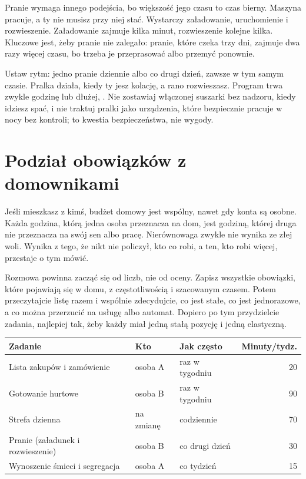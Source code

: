 Pranie wymaga innego podejścia, bo większość jego czasu to czas bierny.
Maszyna pracuje, a ty nie musisz przy niej stać. Wystarczy załadowanie,
uruchomienie i rozwieszenie. Załadowanie zajmuje kilka minut, rozwieszenie
kolejne kilka. Kluczowe jest, żeby pranie nie zalegało: pranie, które
czeka trzy dni, zajmuje dwa razy więcej czasu, bo trzeba je przeprasować
albo przemyć ponownie.

Ustaw rytm: jedno pranie dziennie albo co drugi dzień, zawsze w tym samym
czasie. Pralka działa, kiedy ty jesz kolację, a rano rozwieszasz. Program
trwa zwykle godzinę lub dłużej, . Nie zostawiaj włączonej suszarki bez nadzoru,
kiedy idziesz spać, i nie traktuj pralki jako urządzenia, które bezpiecznie
pracuje w nocy bez kontroli; to kwestia bezpieczeństwa, nie wygody.

\section{Podział obowiązków z domownikami}

Jeśli mieszkasz z kimś, budżet domowy jest wspólny, nawet gdy konta są
osobne. Każda godzina, którą jedna osoba przeznacza na dom, jest godziną,
której druga nie przeznacza na swój sen albo pracę. Nierównowaga zwykle nie
wynika ze złej woli. Wynika z tego, że nikt nie policzył, kto co robi, a
ten, kto robi więcej, przestaje o tym mówić.

Rozmowa powinna zacząć się od liczb, nie od oceny. Zapisz wszystkie
obowiązki, które pojawiają się w domu, z częstotliwością i szacowanym
czasem. Potem przeczytajcie listę razem i wspólnie zdecydujcie, co jest
stałe, co jest jednorazowe, a co można przerzucić na usługę albo
automat. Dopiero po tym przydzielcie zadania, najlepiej tak, żeby każdy
miał jedną stałą pozycję i jedną elastyczną.

\begin{tabular}{@{}lllr@{}}
\toprule
\textbf{Zadanie} & \textbf{Kto} & \textbf{Jak często} & \textbf{Minuty/tydz.}\\
\midrule
Lista zakupów i zamówienie & osoba A & raz w tygodniu & 20\\
Gotowanie hurtowe & osoba B & raz w tygodniu & 90\\
Strefa dzienna & na zmianę & codziennie & 70\\
Pranie (załadunek i rozwieszenie) & osoba B & co drugi dzień & 30\\
Wynoszenie śmieci i segregacja & osoba A & co tydzień & 15\\
\bottomrule
\end{tabular}

